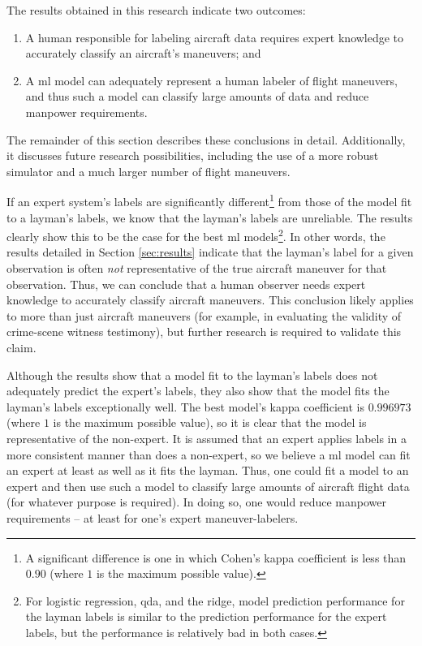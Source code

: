 \documentclass[../main.tex]{subfiles}
\begin{document}

The results obtained in this research indicate two outcomes:

\begin{enumerate}
    \item A human responsible for labeling aircraft data requires expert knowledge to accurately classify an aircraft's maneuvers; and
    \item A \acl{ml} model can adequately represent a human labeler of flight maneuvers, and thus such a model can classify large amounts of data and reduce manpower requirements.
\end{enumerate}

\noindent The remainder of this section describes these conclusions in detail. Additionally, it discusses future research possibilities, including the use of a more robust simulator and a much larger number of flight maneuvers.


If an expert system's labels are significantly different\footnote{A significant difference is one in which Cohen's kappa coefficient is less than $0.90$ (where $1$ is the maximum possible value).} from those of the model fit to a layman's labels, we know that the layman's labels are unreliable. The results clearly show this to be the case for the best \ac{ml} models\footnote{For logistic regression, \ac{qda}, and the ridge, model prediction performance for the layman labels is similar to the prediction performance for the expert labels, but the performance is relatively bad in both cases.}. In other words, the results detailed in Section \ref{sec:results} indicate that the layman's label for a given observation is often \textit{not} representative of the true aircraft maneuver for that observation. Thus, we can conclude that a human observer needs expert knowledge to accurately classify aircraft maneuvers. This conclusion likely applies to more than just aircraft maneuvers (for example, in evaluating the validity of crime-scene witness testimony), but further research is required to validate this claim.

Although the results show that a model fit to the layman's labels does not adequately predict the expert's labels, they also show that the model fits the layman's labels exceptionally well. The best model's kappa coefficient is $0.996973$ (where $1$ is the maximum possible value), so it is clear that the model is representative of the non-expert. It is assumed that an expert applies labels in a more consistent manner than does a non-expert, so we believe a \acl{ml} model can fit an expert at least as well as it fits the layman. Thus, one could fit a model to an expert and then use such a model to classify large amounts of aircraft flight data (for whatever purpose is required). In doing so, one would reduce manpower requirements -- at least for one's expert maneuver-labelers.
\end{document}
